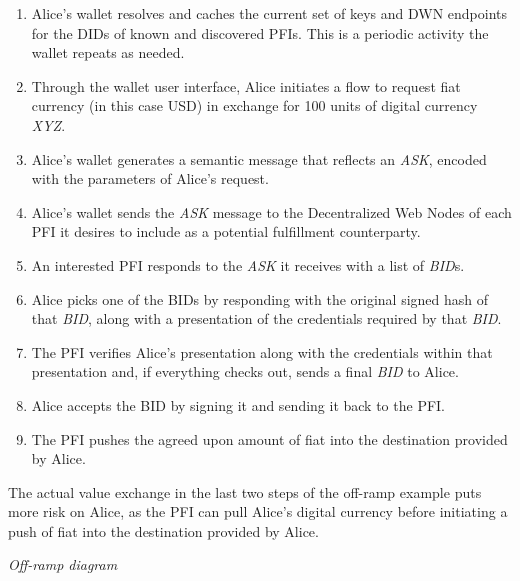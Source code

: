 \documentclass[11pt]{article}
\begin{document}
\begin{enumerate}
	\item Alice’s wallet resolves and caches the current set of keys and DWN endpoints for the DIDs of known and discovered PFIs. This is a periodic activity the wallet repeats as needed.

	\item Through the wallet user interface, Alice initiates a flow to request fiat currency (in this case USD) in exchange for 100 units of digital currency \textit{XYZ}.

	\item Alice’s wallet generates a semantic message that reflects an \textit{ASK}, encoded with the parameters of Alice’s request.  

	\item Alice’s wallet sends the \textit{ASK} message to the Decentralized Web Nodes of each PFI it desires to include as a potential fulfillment counterparty.

	\item An interested PFI responds to the \textit{ASK} it receives with a list of \textit{BID}s. 

	\item Alice picks one of the BIDs by responding with the original signed hash of that \textit{BID}, along with a presentation of the credentials required by that \textit{BID}. 

	\item The PFI verifies Alice’s presentation along with the credentials within that presentation and, if everything checks out, sends a final \textit{BID} to Alice.

	\item Alice accepts the BID by signing it and sending it back to the PFI.


	\item The PFI pushes the agreed upon amount of fiat into the destination provided by Alice.

\vspace{1\baselineskip}
\end{enumerate}

\vspace{1\baselineskip}
The actual value exchange in the last two steps of the off-ramp example puts more risk on Alice, as the PFI can pull Alice’s digital currency before initiating a push of fiat into the destination provided by Alice. \textcolor[HTML]{202124}

\vspace{9\baselineskip}
\begin{center}
\textit{\textcolor[HTML]{3C4043}{Off-ramp diagram}}
\end{center}
\end{document}
